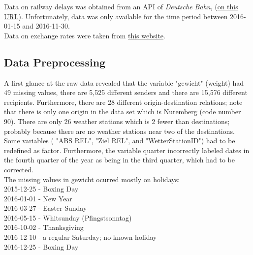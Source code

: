 \documentclass[a4paper, 11pt]{article}
\begin{document}
Data on railway delays was obtained from an API of \textit{Deutsche Bahn}, (\href{http://data.deutschebahn.com/dataset/ist-verkehrsdaten-der-db-cargo-auf-bst8-ebene}{on this URL}). Unfortunately, data was only available for the time period between 2016-01-15 and 2016-11-30.\\

Data on exchange rates were taken from \href{https://www.finanzen.net/devisen/dollarkurs/historisch}{this website}.

\subsection{Data Preprocessing}

A first glance at the raw data revealed that the variable "gewicht" (weight) had 49 missing values, there are 5,525 different senders and there are 15,576 different recipients. Furthermore, there are 28 different origin-destination relations; note that there is only one origin in the data set which is Nuremberg (code number 90). There are only 26 weather stations which is 2 fewer than destinations; probably because there are no weather stations near two of the destinations.
Some variables ( "ABS$\_$REL", "Ziel$\_$REL", and "WetterStationID") had to be redefined as factor. Furthermore, the variable quarter incorrectly labeled dates in the fourth quarter of the year as being in the third quarter, which had to be corrected. \\
The missing values in gewicht ocurred mostly on holidays:\\
2015-12-25 - Boxing Day\\
2016-01-01 - New Year\\
2016-03-27 - Easter Sunday\\
2016-05-15 - Whitsunday (Pfingstsonntag)\\
2016-10-02 - Thanksgiving\\
2016-12-10 - a regular Saturday; no known holiday\\
2016-12-25 - Boxing Day \\
\end{document}
